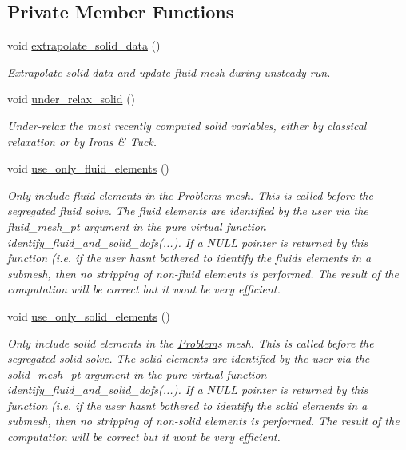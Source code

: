 \subsection*{Private Member Functions}
\begin{DoxyCompactItemize}
\item 
void \hyperlink{classoomph_1_1SegregatableFSIProblem_a0e67b39cdae35ea25ef97e5e768aa60a}{extrapolate\+\_\+solid\+\_\+data} ()
\begin{DoxyCompactList}\small\item\em Extrapolate solid data and update fluid mesh during unsteady run. \end{DoxyCompactList}\item 
void \hyperlink{classoomph_1_1SegregatableFSIProblem_a9da3017952982a64496ff9c16ca7024c}{under\+\_\+relax\+\_\+solid} ()
\begin{DoxyCompactList}\small\item\em Under-\/relax the most recently computed solid variables, either by classical relaxation or by Irons \& Tuck. \end{DoxyCompactList}\item 
void \hyperlink{classoomph_1_1SegregatableFSIProblem_a13a9841e0aa05bf57ec228b49b311a26}{use\+\_\+only\+\_\+fluid\+\_\+elements} ()
\begin{DoxyCompactList}\small\item\em Only include fluid elements in the \hyperlink{classoomph_1_1Problem}{Problem}\textquotesingle{}s mesh. This is called before the segregated fluid solve. The fluid elements are identified by the user via the fluid\+\_\+mesh\+\_\+pt argument in the pure virtual function identify\+\_\+fluid\+\_\+and\+\_\+solid\+\_\+dofs(...). If a N\+U\+LL pointer is returned by this function (i.\+e. if the user hasn\textquotesingle{}t bothered to identify the fluids elements in a submesh, then no stripping of non-\/fluid elements is performed. The result of the computation will be correct but it won\textquotesingle{}t be very efficient. \end{DoxyCompactList}\item 
void \hyperlink{classoomph_1_1SegregatableFSIProblem_a330660bc7b69c9c128bfed62b54dcf62}{use\+\_\+only\+\_\+solid\+\_\+elements} ()
\begin{DoxyCompactList}\small\item\em Only include solid elements in the \hyperlink{classoomph_1_1Problem}{Problem}\textquotesingle{}s mesh. This is called before the segregated solid solve. The solid elements are identified by the user via the solid\+\_\+mesh\+\_\+pt argument in the pure virtual function identify\+\_\+fluid\+\_\+and\+\_\+solid\+\_\+dofs(...). If a N\+U\+LL pointer is returned by this function (i.\+e. if the user hasn\textquotesingle{}t bothered to identify the solid elements in a submesh, then no stripping of non-\/solid elements is performed. The result of the computation will be correct but it won\textquotesingle{}t be very efficient. \end{DoxyCompactList}\item 

\end{DoxyCompactItemize}
